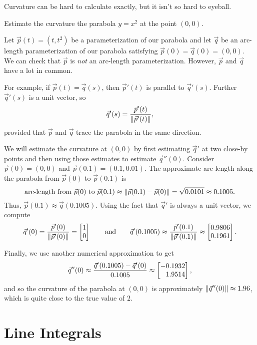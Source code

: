 Curvature can be hard to calculate exactly, but it isn't so hard to eyeball.

\begin{example}
	Estimate the curvature the parabola $y=x^2$ at the point $(0,0)$.
	
	Let $\vec p(t)=(t,t^2)$ be a parameterization of our parabola
	and let $\vec q$ be an arc-length parameterization of our parabola
	satisfying $\vec p(0)=\vec q(0)=(0,0)$.
	We can check that $\vec p$ is \emph{not} an arc-length parameterization.  
	However, $\vec p$ and $\vec q$ have a lot in common.

	For example, if $\vec p(t)=\vec q(s)$,
	then $\vec p'(t)$ is parallel to $\vec q'(s)$.  Further $\vec q'(s)$ is a unit
	vector, so
	\[
		\vec q'(s) = \frac{\vec p'(t)}{\lVert\vec p'(t)\rVert},
	\]
	provided that $\vec p$ and $\vec q$ trace the parabola in the same direction.

	We will estimate the curvature at $(0,0)$
	by first estimating $\vec q'$ at two close-by points and then using
	those estimates to estimate $\vec q''(0)$.
	Consider $\vec p(0)=(0,0)$ and $\vec p(0.1) = (0.1, 0.01)$.  The approximate
	arc-length along the parabola from $\vec p(0)$ to $\vec p(0.1)$ is 
	\[
		\text{arc-length from }\vec p(0)\text{ to }\vec p(0.1)
		\approx \lVert\vec p(0.1) - \vec p(0)\rVert = \sqrt{0.0101}
		\approx 0.1005.
	\]
	Thus, $\vec p(0.1)\approx \vec q(0.1005)$.  Using the fact that
	$\vec q'$ is always a unit vector, we compute
	\[
		\vec q'(0) = \frac{\vec p'(0)}{\norm{\vec p'(0)}} = \mat{1\\0}
		\qquad\text{and}\qquad
		\vec q'(0.1005) \approx \frac{\vec p'(0.1)}{\norm{\vec p'(0.1)}}
		\approx\mat{0.9806\\0.1961}.
	\]

	Finally, we use another numerical approximation to get
	\[
		\vec q''(0) \approx \frac{\vec q'(0.1005)-\vec q'(0)}{0.1005}
		\approx \mat{-0.1932\\1.9514},
	\]
	and so the curvature of the parabola at $(0,0)$ is approximately
	$\lVert\vec q''(0)\rVert\approx 1.96$, which is quite close to the true value of $2$.
\end{example}

\begin{exercises}
\end{exercises}

\section{Line Integrals}

